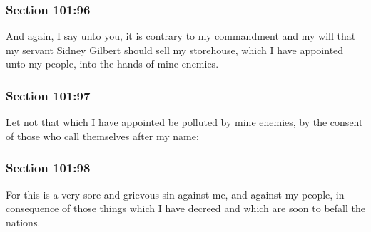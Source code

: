 	\subsubsection{Section 101:96} %
		\label{DC101-96}

		And again, I say unto you, it is contrary to my commandment and my will that my servant Sidney Gilbert should sell my storehouse, which I have appointed unto my people, into the hands of mine enemies.


	\subsubsection{Section 101:97} %
		\label{DC101-97}

		Let not that which I have appointed be polluted by mine enemies, by the consent of those who call themselves after my name;


	\subsubsection{Section 101:98} %
		\label{DC101-98}

		For this is a very sore and grievous sin against me, and against my people, in consequence of those things which I have decreed and which are soon to befall the nations.


